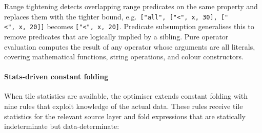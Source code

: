 Range tightening detects overlapping range predicates on the same property and replaces them with the tighter bound, e.g.\ \texttt{["all",~["<",~x,~30],~["<",~x,~20]]} becomes \texttt{["<",~x,~20]}.
Predicate subsumption generalises this to remove predicates that are logically implied by a sibling.
Pure operator evaluation computes the result of any operator whose arguments are all literals, covering mathematical functions, string operations, and colour constructors.

\paragraph{Stats-driven constant folding}
When tile statistics are available, the optimiser extends constant folding with nine rules that exploit knowledge of the actual data.
These rules receive tile statistics for the relevant source layer and fold expressions that are statically indeterminate but data-determinate:

